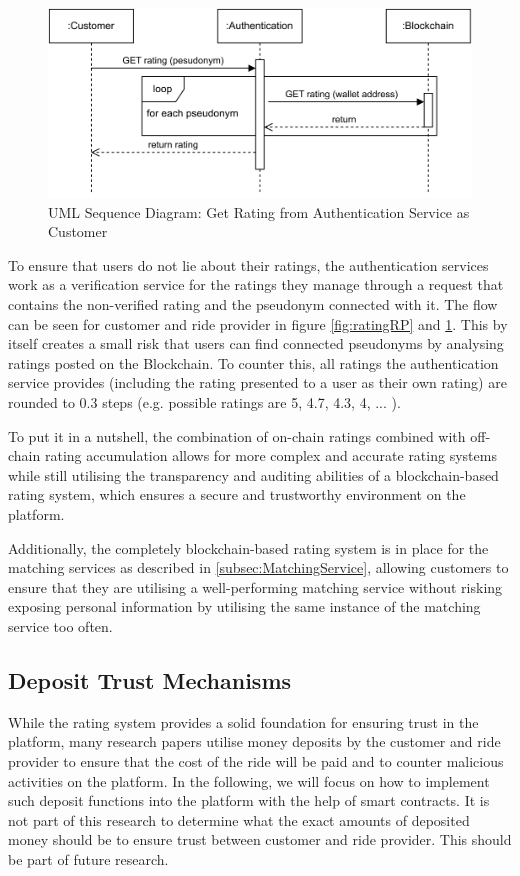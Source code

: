 \begin{figure}[h]
    \centering
    \includegraphics[width=\linewidth]{data/9.svg}
    \caption{UML Sequence Diagram: Get Rating from Authentication Service as Customer}
    \label{fig:ratingC}
\end{figure}


To ensure that users do not lie about their ratings, the authentication services work as a verification service for the ratings they manage through a request that contains the non-verified rating and the pseudonym connected with it. The flow can be seen for customer and ride provider in figure \ref{fig:ratingRP} and \ref{fig:ratingC}. This by itself creates a small risk that users can find connected pseudonyms by analysing ratings posted on the Blockchain. To counter this, all ratings the authentication service provides (including the rating presented to a user as their own rating) are rounded to 0.3 steps (e.g. possible ratings are 5, 4.7, 4.3, 4, ... ). 


To put it in a nutshell, the combination of on-chain ratings combined with off-chain rating accumulation allows for more complex and accurate rating systems while still utilising the transparency and auditing abilities of a blockchain-based rating system, which ensures a secure and trustworthy environment on the platform.

Additionally, the completely blockchain-based rating system is in place for the matching services as described in \ref{subsec:MatchingService}, allowing customers to ensure that they are utilising a well-performing matching service without risking exposing personal information by utilising the same instance of the matching service too often.

\subsection{Deposit Trust Mechanisms}\label{subsec:DepositTrust}
While the rating system provides a solid foundation for ensuring trust in the platform, many research papers utilise money deposits by the customer and ride provider to ensure that the cost of the ride will be paid and to counter malicious activities on the platform. In the following, we will focus on how to implement such deposit functions into the platform with the help of smart contracts. It is not part of this research to determine what the exact amounts of deposited money should be to ensure trust between customer and ride provider. This should be part of future research.

